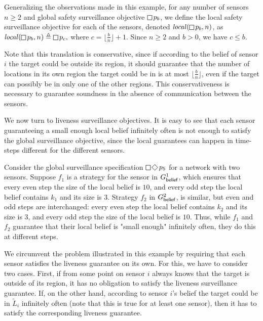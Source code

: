 Generalizing the observations made in this example, for any number of sensors $n \geq 2$ and global safety surveillance objective $\LTLglobally p_b$, we define the local safety surveillance objective for each of the sensors, denoted $\locspec(\LTLglobally p_b,n)$, as $\locspec(\LTLglobally p_b,n) \triangleq \LTLglobally p_c,$ where $c = \lfloor{\frac{b}{n}}\rfloor+1$. Since $n \geq 2$ and $b >0$, we have $c \leq b$.

Note that this translation is conservative, since if according to the belief of sensor $i$ the target could be outside its region, it should guarantee that the number of locations in its own region the target could be in is at most  $\lfloor{\frac{b}{n}}\rfloor$, even if the target can possibly be in only one of the other regions. This conservativeness is necessary to guarantee soundness in the absence of communication between the sensors.

We now turn to liveness surveillance objectives. It is easy to see that each sensor guaranteeing a small enough local belief infinitely often is not enough to satisfy the global surveillance objective, since the local guarantees can happen in time-steps different for the different sensors.

\begin{example}\label{ex:global-local-liveness}
Consider the global surveillance specification $\LTLglobally\LTLfinally p_5$ for a network with two sensors. Suppose $f_1$ is a strategy for the sensor in $G^1_{\mathsf{belief}}$,  which ensures that every even step the size of the local belief is $10$, and every odd step the local belief contains $k_1$ and its size is $3$. Strategy  $f_2$ in $G^2_{\mathsf{belief}}$,  is similar, but even and odd steps are interchanged: every even step the local belief contains $k_2$ and its size is $3$, and every odd step the size of the local belief is $10$.  Thus, while $f_1$ and $f_2$ guarantee that their local belief is "small enough" infinitely often, they do this at different steps.
\end{example}

We circumvent the problem illustrated in this example by requiring that each sensor satisfies the liveness guarantee on its own. For this, we have to consider two cases. First, if from some point on sensor $i$ always knows that the target is outside of its region, it has no obligation to satisfy the liveness surveillance guarantee. If, on the other hand, according to sensor $i$'s belief the target could be in $\widetilde L_i$ infinitely often (note that this is true for at least one sensor), then it has to satisfy the corresponding liveness guarantee.

